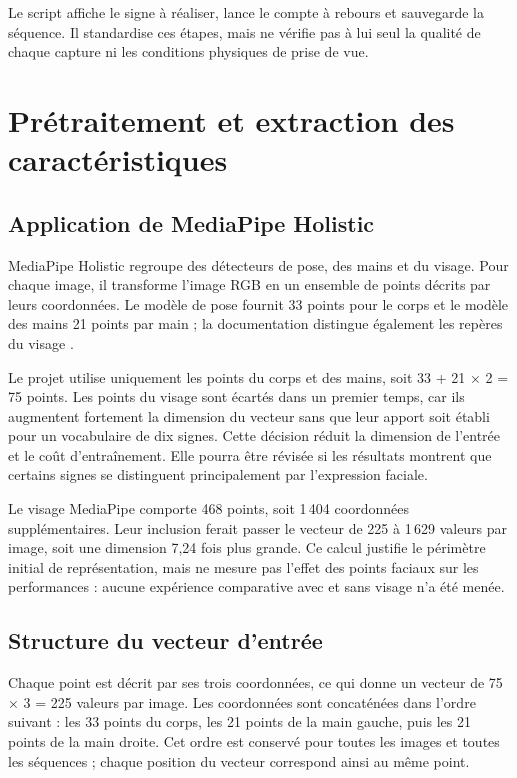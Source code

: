 Le script affiche le signe à réaliser, lance le compte à rebours et sauvegarde la séquence. Il standardise ces étapes, mais ne vérifie pas à lui seul la qualité de chaque capture ni les conditions physiques de prise de vue.

\section{Prétraitement et extraction des caractéristiques}

\subsection{Application de MediaPipe Holistic}

MediaPipe Holistic regroupe des détecteurs de pose, des mains et du visage. Pour chaque image, il transforme l'image RGB en un ensemble de points décrits par leurs coordonnées. Le modèle de pose fournit 33 points pour le corps et le modèle des mains 21 points par main ; la documentation distingue également les repères du visage .

Le projet utilise uniquement les points du corps et des mains, soit 33 + 21 × 2 = 75 points. Les points du visage sont écartés dans un premier temps, car ils augmentent fortement la dimension du vecteur sans que leur apport soit établi pour un vocabulaire de dix signes. Cette décision réduit la dimension de l'entrée et le coût d'entraînement. Elle pourra être révisée si les résultats montrent que certains signes se distinguent principalement par l'expression faciale.

Le visage MediaPipe comporte 468 points, soit 1\,404 coordonnées supplémentaires. Leur inclusion ferait passer le vecteur de 225 à 1\,629 valeurs par image, soit une dimension 7,24 fois plus grande. Ce calcul justifie le périmètre initial de représentation, mais ne mesure pas l'effet des points faciaux sur les performances : aucune expérience comparative avec et sans visage n'a été menée.

\subsection{Structure du vecteur d'entrée}

Chaque point est décrit par ses trois coordonnées, ce qui donne un vecteur de 75 × 3 = 225 valeurs par image. Les coordonnées sont concaténées dans l'ordre suivant : les 33 points du corps, les 21 points de la main gauche, puis les 21 points de la main droite. Cet ordre est conservé pour toutes les images et toutes les séquences ; chaque position du vecteur correspond ainsi au même point.

